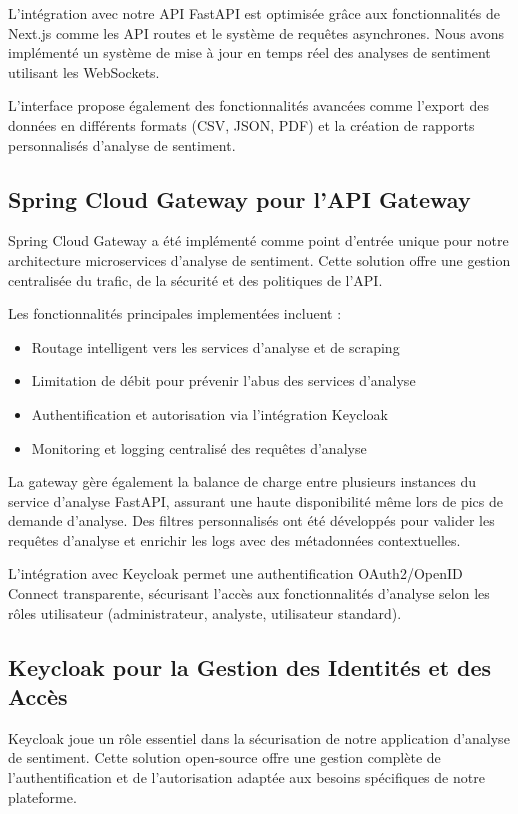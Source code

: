 L'intégration avec notre API FastAPI est optimisée grâce aux fonctionnalités de Next.js comme les API routes et le système de requêtes asynchrones. Nous avons implémenté un système de mise à jour en temps réel des analyses de sentiment utilisant les WebSockets.

L'interface propose également des fonctionnalités avancées comme l'export des données en différents formats (CSV, JSON, PDF) et la création de rapports personnalisés d'analyse de sentiment.

\subsection{Spring Cloud Gateway pour l'API Gateway}
Spring Cloud Gateway a été implémenté comme point d'entrée unique pour notre architecture microservices d'analyse de sentiment. Cette solution offre une gestion centralisée du trafic, de la sécurité et des politiques de l'API.

Les fonctionnalités principales implementées incluent :
\begin{itemize}
    \item Routage intelligent vers les services d'analyse et de scraping
    \item Limitation de débit pour prévenir l'abus des services d'analyse
    \item Authentification et autorisation via l'intégration Keycloak
    \item Monitoring et logging centralisé des requêtes d'analyse
\end{itemize}

La gateway gère également la balance de charge entre plusieurs instances du service d'analyse FastAPI, assurant une haute disponibilité même lors de pics de demande d'analyse. Des filtres personnalisés ont été développés pour valider les requêtes d'analyse et enrichir les logs avec des métadonnées contextuelles.

L'intégration avec Keycloak permet une authentification OAuth2/OpenID Connect transparente, sécurisant l'accès aux fonctionnalités d'analyse selon les rôles utilisateur (administrateur, analyste, utilisateur standard).

\subsection{Keycloak pour la Gestion des Identités et des Accès}
Keycloak joue un rôle essentiel dans la sécurisation de notre application d'analyse de sentiment. Cette solution open-source offre une gestion complète de l'authentification et de l'autorisation adaptée aux besoins spécifiques de notre plateforme.

